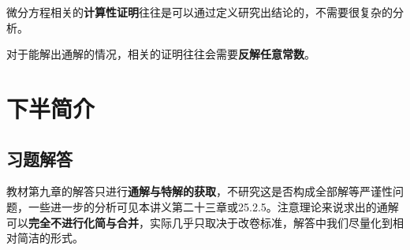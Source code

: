 \documentclass[a4paper,UTF8,fontset=windows,AutoFakeBold]{ctexart}
\newcommand*{\note}{\noindent *}
\theoremstyle{ex}
\begin{document}
\note 微分方程相关的\textbf{计算性证明}往往是可以通过定义研究出结论的，不需要很复杂的分析。

\note 对于能解出通解的情况，相关的证明往往会需要\textbf{反解任意常数}。

\newpage
\section{下半简介}
\subsection{习题解答}
\note 教材第九章的解答只进行\textbf{通解与特解的获取}，不研究这是否构成全部解等严谨性问题，一些进一步的分析可见本讲义第二十三章或25.2.5。注意理论来说求出的通解可以\textbf{完全不进行化简与合并}，实际几乎只取决于改卷标准，解答中我们尽量化到相对简洁的形式。
\end{document}
